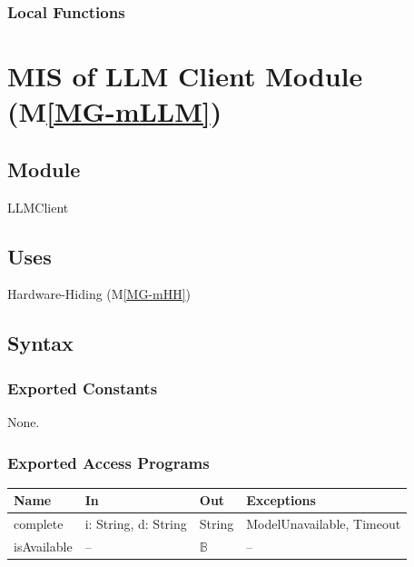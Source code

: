 \documentclass[12pt, titlepage]{article}
\newcommand{\mref}[1]{M\ref{MG-#1}}
\begin{document}
\subsubsection{Local Functions}

\newpage

\section{MIS of LLM Client Module (\mref{mLLM})} \label{mis-mLLM}

\subsection{Module}

LLMClient

\subsection{Uses}

Hardware-Hiding (\mref{mHH})

\subsection{Syntax}

\subsubsection{Exported Constants}

None.

\subsubsection{Exported Access Programs}

\begin{center}\small
\begin{tabular}{>{\raggedright\arraybackslash}p{2.2cm} >{\raggedright\arraybackslash}p{4.2cm} >{\raggedright\arraybackslash}p{4.3cm} >{\raggedright\arraybackslash}p{3.9cm}}
\hline
\textbf{Name} & \textbf{In} & \textbf{Out} & \textbf{Exceptions} \\
\hline
complete & i: String, d: String & String & ModelUnavailable, Timeout \\
isAvailable & -- & $\mathbb{B}$ & -- \\
\hline
\end{tabular}
\end{center}
\end{document}

